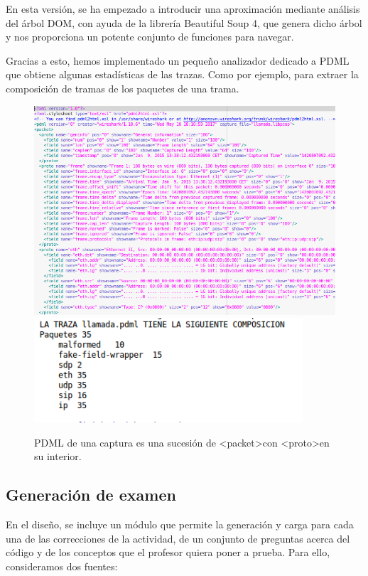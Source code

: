En esta versión,  se ha empezado a introducir una aproximación mediante análisis del árbol DOM, con ayuda de la librería Beautiful Soup 4, que genera dicho árbol y nos proporciona un potente conjunto de funciones para navegar.


Gracias a esto, hemos implementado un pequeño analizador dedicado a PDML que obtiene algunas estadísticas de las trazas. Como por ejemplo, para extraer la composición de tramas de los paquetes de una trama.

\begin{figure}[H]
   \centering
   \includegraphics[width=16cm]{img/Selection_015_pdml_1}
   \includegraphics[width=10cm]{img/Selection_029_pdml}
   \caption{PDML de una captura es una sucesión de \textless packet\textgreater \space   con \textless proto\textgreater  \space en su interior.}
   \label{figura:pdml}
\end{figure}


\subsection{Generación de examen}

En el diseño, se incluye un módulo que permite la generación y carga para cada una de las correcciones de la actividad, de un conjunto de preguntas acerca del código y de los conceptos que el profesor quiera poner a prueba. Para ello, consideramos dos fuentes:

